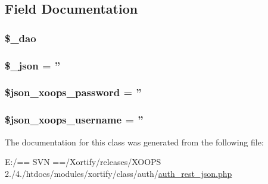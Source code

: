 \subsection{Field Documentation}
\hypertarget{class_xortify_auth_rest___json_a12a029c610f699b4b25e79a1f64a3485}{
\subsubsection[{\$\-\_\-dao}]{\setlength{\rightskip}{0pt plus 5cm}\$\-\_\-dao}}\label{class_xortify_auth_rest___json_a12a029c610f699b4b25e79a1f64a3485}
\hypertarget{class_xortify_auth_rest___json_a94787b37d92a2dee02534eed4f316589}{
\subsubsection[{\$\-\_\-json}]{\setlength{\rightskip}{0pt plus 5cm}\$\-\_\-json = ''}}\label{class_xortify_auth_rest___json_a94787b37d92a2dee02534eed4f316589}
\hypertarget{class_xortify_auth_rest___json_a7af311f07c1c09254920e6ac0cefe9a9}{
\subsubsection[{\$json\-\_\-xoops\-\_\-password}]{\setlength{\rightskip}{0pt plus 5cm}\$json\-\_\-xoops\-\_\-password = ''}}\label{class_xortify_auth_rest___json_a7af311f07c1c09254920e6ac0cefe9a9}
\hypertarget{class_xortify_auth_rest___json_ac058687d82a56fb93513e7e58c4ec391}{
\subsubsection[{\$json\-\_\-xoops\-\_\-username}]{\setlength{\rightskip}{0pt plus 5cm}\$json\-\_\-xoops\-\_\-username = ''}}\label{class_xortify_auth_rest___json_ac058687d82a56fb93513e7e58c4ec391}


The documentation for this class was generated from the following file\-:\begin{DoxyCompactItemize}
\item 
E\-:/== S\-V\-N ==/\-Xortify/releases/\-X\-O\-O\-P\-S 2./4./htdocs/modules/xortify/class/auth/\hyperlink{auth__rest__json_8php}{auth\-\_\-rest\-\_\-json.\-php}\end{DoxyCompactItemize}
